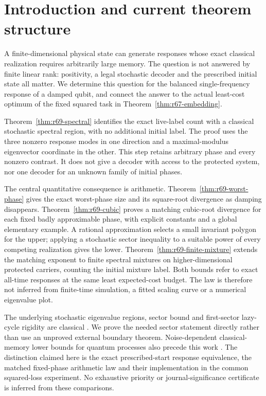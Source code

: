 \section{Introduction and current theorem structure}\label{sec:current-overview}\label{sec:introduction}
A finite-dimensional physical state can generate responses whose exact classical realization requires arbitrarily large memory. The question is not answered by finite linear rank: positivity, a legal stochastic decoder and the prescribed initial state all matter. We determine this question for the balanced single-frequency response of a damped qubit, and connect the answer to the actual least-cost optimum of the fixed squared task in Theorem~\ref{thm:r67-embedding}.

Theorem~\ref{thm:r69-spectral} identifies the exact live-label count with a classical stochastic spectral region, with no additional initial label. The proof uses the three nonzero response modes in one direction and a maximal-modulus eigenvector coordinate in the other. This step retains arbitrary phase and every nonzero contrast. It does not give a decoder with access to the protected system, nor one decoder for an unknown family of initial phases.

The central quantitative consequence is arithmetic. Theorem~\ref{thm:r69-worst-phase} gives the exact worst-phase size and its square-root divergence as damping disappears. Theorem~\ref{thm:r69-cubic} proves a matching cubic-root divergence for each fixed badly approximable phase, with explicit constants and a global elementary example. A rational approximation selects a small invariant polygon for the upper; applying a stochastic sector inequality to a suitable power of every competing realization gives the lower. Theorem~\ref{thm:r69-finite-mixture} extends the matching exponent to finite spectral mixtures on higher-dimensional protected carriers, counting the initial mixture label. Both bounds refer to exact all-time responses at the same least expected-cost budget. The law is therefore not inferred from finite-time simulation, a fitted scaling curve or a numerical eigenvalue plot.

The underlying stochastic eigenvalue regions, sector bound and first-sector lazy-cycle rigidity are classical \cite{DmitrievDynkin46,JohnsonPaparella17,KirklandSmigoc22}. We prove the needed sector statement directly rather than use an unproved external boundary theorem. Noise-dependent classical-memory lower bounds for quantum processes also precede this work \cite{Fanizza24}. The distinction claimed here is the exact prescribed-start response equivalence, the matched fixed-phase arithmetic law and their implementation in the common squared-loss experiment. No exhaustive priority or journal-significance certificate is inferred from these comparisons.

